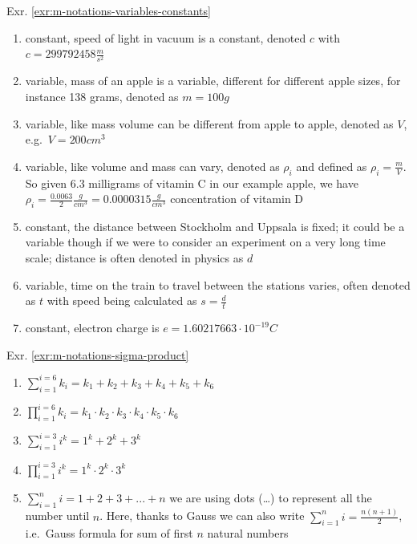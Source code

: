 \documentclass[
]{book}
\providecommand{\tightlist}{%
  \setlength{\itemsep}{0pt}\setlength{\parskip}{0pt}}
\theoremstyle{definition}
\theoremstyle{definition}
\theoremstyle{definition}
\theoremstyle{remark}
\begin{document}
Exr. \ref{exr:m-notations-variables-constants}

\begin{enumerate}
\def\labelenumi{\alph{enumi})}
\tightlist
\item
  constant, speed of light in vacuum is a constant, denoted \(c\) with \(c=299 792 458 \frac{m}{s^2}\)
\item
  variable, mass of an apple is a variable, different for different apple sizes, for instance 138 grams, denoted as \(m = 100 g\)
\item
  variable, like mass volume can be different from apple to apple, denoted as \(V\), e.g.~\(V = 200 cm^3\)
\item
  variable, like volume and mass can vary, denoted as \(\rho_i\) and defined as \(\rho_i=\frac{m}{V}\). So given 6.3 milligrams of vitamin C in our example apple, we have \(\rho_i=\frac{0.0063}{2}\frac{g}{cm^3} = 0.0000315 \frac{g}{cm^3}\) concentration of vitamin D
\item
  constant, the distance between Stockholm and Uppsala is fixed; it could be a variable though if we were to consider an experiment on a very long time scale; distance is often denoted in physics as \(d\)
\item
  variable, time on the train to travel between the stations varies, often denoted as \(t\) with speed being calculated as \(s = \frac{d}{t}\)
\item
  constant, electron charge is \(e = 1.60217663\cdot10^{-19} C\)
\end{enumerate}

Exr. \ref{exr:m-notations-sigma-product}

\begin{enumerate}
\def\labelenumi{\alph{enumi})}
\item
  \(\sum_{i=1}^{i=6}k_i = k_1 + k_2 + k_3 + k_4 + k_5 + k_6\)
\item
  \(\prod_{i=1}^{i=6}k_i = k_1 \cdot k_2 \cdot k_3 \cdot k_4 \cdot k_5 \cdot k_6\)
\item
  \(\sum_{i=1}^{i=3}i^k = 1^k + 2^k + 3^k\)
\item
  \(\prod_{i=1}^{i=3}i^k = 1^k \cdot 2^k \cdot 3^k\)
\item
  \(\sum_{i=1}^{n}i = 1 + 2 + 3 + ... + n\) we are using dots (\ldots) to represent all the number until \(n\). Here, thanks to Gauss we can also write \(\sum_{i=1}^{n}i = \frac{n(n+1)}{2}\), i.e.~Gauss formula for sum of first \(n\) natural numbers
\end{enumerate}
\end{document}
